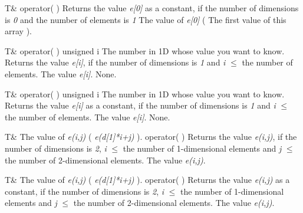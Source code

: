 \setConstInstance
\printEmptyMethodReturn
{T\&}
{operator( )}
{Returns the value {\em e[0]} as a constant, if the number of
dimensions is {\em 0} and the number of elements is {\em 1}}
{The value of {\em e[0]} ( The first value of this array ).}

\setNormalInstance
\printMethodWithOneParam
{T\&}
{operator( )}
{unsigned}
{i}
{The number in 1D whose value you want to know.}
{Returns the value {\em e[i]}, if the number of dimensions is {\em 1}
and {\em i} $\le$ the number of elements.}
{The value {\em e[i]}.}
{None.}

\setConstInstance
\printMethodWithOneParam
{T\&}
{operator( )}
{unsigned}
{i}
{The number in 1D whose value you want to know.}
{Returns the value {\em e[i]} as a constant, if the number of
dimensions is {\em 1} and {\em i} $\le$ the number of elements.}
{The value {\em e[i]}.}
{None.}

\clearpage

\setNormalInstance
\setCorrectWidthThree{8pt}
\printMethodWithParamsSaved
{T\&}
{The value of {\em e(i,j)} ( {\em e(d[1]*i+j)} ).}
{operator( )}
{Returns the value {\em e(i,j)}, if the number of dimensions is {\em
2}, {\em i} $\le$ the number of 1-dimensional elements and {\em j} $\le$ the
number of 2-dimensional elements.}
{The value {\em e(i,j)}.}
\setCorrectWidthThree{4pt}

\setConstInstance
\setCorrectWidthThree{8pt}
\printMethodWithParamsSaved
{T\&}
{The value of {\em e(i,j)} ( {\em e(d[1]*i+j)} ).}
{operator( )}
{Returns the value {\em e(i,j)} as a constant, if the number of dimensions is
{\em 2}, {\em i} $\le$ the number of 1-dimensional elements and {\em j} $\le$ the number of 2-dimensional elements.}
{The value {\em e(i,j)}.}
\setCorrectWidthThree{4pt}

